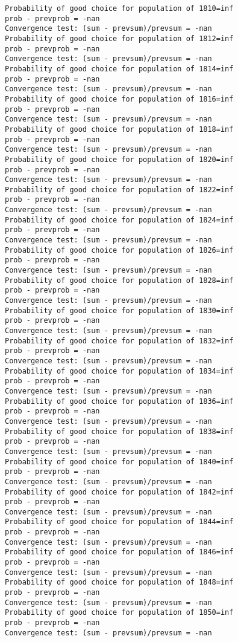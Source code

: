 \documentclass[11pt,onecolumn]{article}
\begin{document}
\begin{verbatim}
Probability of good choice for population of 1810=inf
prob - prevprob = -nan
Convergence test: (sum - prevsum)/prevsum = -nan
Probability of good choice for population of 1812=inf
prob - prevprob = -nan
Convergence test: (sum - prevsum)/prevsum = -nan
Probability of good choice for population of 1814=inf
prob - prevprob = -nan
Convergence test: (sum - prevsum)/prevsum = -nan
Probability of good choice for population of 1816=inf
prob - prevprob = -nan
Convergence test: (sum - prevsum)/prevsum = -nan
Probability of good choice for population of 1818=inf
prob - prevprob = -nan
Convergence test: (sum - prevsum)/prevsum = -nan
Probability of good choice for population of 1820=inf
prob - prevprob = -nan
Convergence test: (sum - prevsum)/prevsum = -nan
Probability of good choice for population of 1822=inf
prob - prevprob = -nan
Convergence test: (sum - prevsum)/prevsum = -nan
Probability of good choice for population of 1824=inf
prob - prevprob = -nan
Convergence test: (sum - prevsum)/prevsum = -nan
Probability of good choice for population of 1826=inf
prob - prevprob = -nan
Convergence test: (sum - prevsum)/prevsum = -nan
Probability of good choice for population of 1828=inf
prob - prevprob = -nan
Convergence test: (sum - prevsum)/prevsum = -nan
Probability of good choice for population of 1830=inf
prob - prevprob = -nan
Convergence test: (sum - prevsum)/prevsum = -nan
Probability of good choice for population of 1832=inf
prob - prevprob = -nan
Convergence test: (sum - prevsum)/prevsum = -nan
Probability of good choice for population of 1834=inf
prob - prevprob = -nan
Convergence test: (sum - prevsum)/prevsum = -nan
Probability of good choice for population of 1836=inf
prob - prevprob = -nan
Convergence test: (sum - prevsum)/prevsum = -nan
Probability of good choice for population of 1838=inf
prob - prevprob = -nan
Convergence test: (sum - prevsum)/prevsum = -nan
Probability of good choice for population of 1840=inf
prob - prevprob = -nan
Convergence test: (sum - prevsum)/prevsum = -nan
Probability of good choice for population of 1842=inf
prob - prevprob = -nan
Convergence test: (sum - prevsum)/prevsum = -nan
Probability of good choice for population of 1844=inf
prob - prevprob = -nan
Convergence test: (sum - prevsum)/prevsum = -nan
Probability of good choice for population of 1846=inf
prob - prevprob = -nan
Convergence test: (sum - prevsum)/prevsum = -nan
Probability of good choice for population of 1848=inf
prob - prevprob = -nan
Convergence test: (sum - prevsum)/prevsum = -nan
Probability of good choice for population of 1850=inf
prob - prevprob = -nan
Convergence test: (sum - prevsum)/prevsum = -nan

\end{verbatim}
\end{document}
